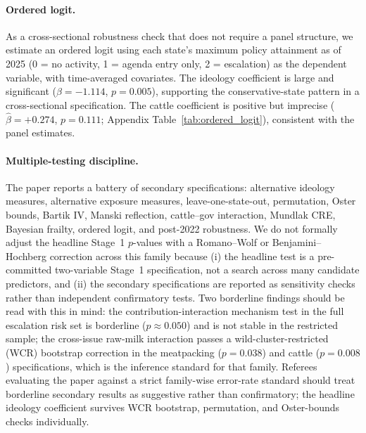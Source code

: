 \documentclass[12pt]{article}
\begin{document}
\paragraph{Ordered logit.}  As a cross-sectional robustness check that does not require a panel structure, we estimate an ordered logit using each state's maximum policy attainment as of 2025 (0 = no activity, 1 = agenda entry only, 2 = escalation) as the dependent variable, with time-averaged covariates.  The ideology coefficient is large and significant ($\hat{\beta} = -1.114$, $p = 0.005$), supporting the conservative-state pattern in a cross-sectional specification.  The cattle coefficient is positive but imprecise ($\hat{\beta} = +0.274$, $p = 0.111$; Appendix Table~\ref{tab:ordered_logit}), consistent with the panel estimates.

\paragraph{Multiple-testing discipline.}  The paper reports a battery of secondary specifications: alternative ideology measures, alternative exposure measures, leave-one-state-out, permutation, Oster bounds, Bartik IV, Manski reflection, cattle--gov interaction, Mundlak CRE, Bayesian frailty, ordered logit, and post-2022 robustness.  We do not formally adjust the headline Stage~1 $p$-values with a Romano--Wolf or Benjamini--Hochberg correction across this family because (i) the headline test is a pre-committed two-variable Stage~1 specification, not a search across many candidate predictors, and (ii) the secondary specifications are reported as sensitivity checks rather than independent confirmatory tests.  Two borderline findings should be read with this in mind: the contribution-interaction mechanism test in the full escalation risk set is borderline ($p \approx 0.050$) and is not stable in the restricted sample; the cross-issue raw-milk interaction passes a wild-cluster-restricted (WCR) bootstrap correction in the meatpacking ($p = 0.038$) and cattle ($p = 0.008$) specifications, which is the inference standard for that family.  Referees evaluating the paper against a strict family-wise error-rate standard should treat borderline secondary results as suggestive rather than confirmatory; the headline ideology coefficient survives WCR bootstrap, permutation, and Oster-bounds checks individually.
\end{document}
